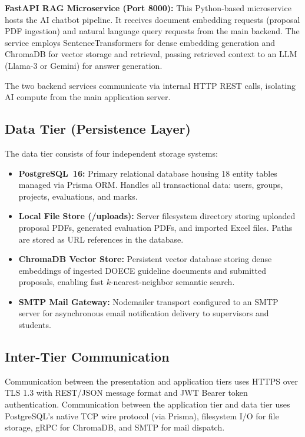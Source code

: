 \documentclass[12pt]{report}
\begin{document}
\textbf{FastAPI RAG Microservice (Port 8000):} This Python-based microservice hosts the AI chatbot pipeline. It receives document embedding requests (proposal PDF ingestion) and natural language query requests from the main backend. The service employs SentenceTransformers for dense embedding generation and ChromaDB for vector storage and retrieval, passing retrieved context to an LLM (Llama-3 or Gemini) for answer generation.

The two backend services communicate via internal HTTP REST calls, isolating AI compute from the main application server.

\subsection{Data Tier (Persistence Layer)}

The data tier consists of four independent storage systems:

\begin{itemize}[leftmargin=*]
  \item \textbf{PostgreSQL~16:} Primary relational database housing 18 entity tables managed via Prisma ORM. Handles all transactional data: users, groups, projects, evaluations, and marks.
  \item \textbf{Local File Store (/uploads):} Server filesystem directory storing uploaded proposal PDFs, generated evaluation PDFs, and imported Excel files. Paths are stored as URL references in the database.
  \item \textbf{ChromaDB Vector Store:} Persistent vector database storing dense embeddings of ingested DOECE guideline documents and submitted proposals, enabling fast $k$-nearest-neighbor semantic search.
  \item \textbf{SMTP Mail Gateway:} Nodemailer transport configured to an SMTP server for asynchronous email notification delivery to supervisors and students.
\end{itemize}

\subsection{Inter-Tier Communication}

Communication between the presentation and application tiers uses HTTPS over TLS 1.3 with REST/JSON message format and JWT Bearer token authentication. Communication between the application tier and data tier uses PostgreSQL's native TCP wire protocol (via Prisma), filesystem I/O for file storage, gRPC for ChromaDB, and SMTP for mail dispatch.
\end{document}
